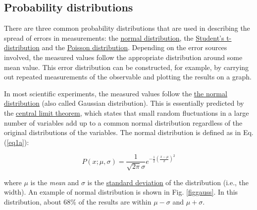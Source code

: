 \documentclass[byrevtex,amssymb,aps,pra,floatfix,letterpaper]{revtex4}
\begin{document}
\subsection{Probability distributions}

There are three common probability distributions that are used in describing the spread of errors in measurements: the \href{http://en.wikipedia.org/wiki/Normal_distribution}{\underline{normal distribution}}, the \href{http://en.wikipedia.org/wiki/Student's_t-distribution}{\underline{Student's t-distribution}} and the \href{http://en.wikipedia.org/wiki/Poisson_distribution}{\underline{Poisson distribution}}. Depending on the error sources involved, the measured values follow the appropriate distribution around some mean value. This error distribution can be constructed, for example, by carrying out repeated measurements of the observable and plotting the results on a graph.

In most scientific experiments, the measured values follow the \href{http://en.wikipedia.org/wiki/Normal_distribution}{\underline{the normal distribution}} (also called Gaussian distribution). This is essentially predicted by the \href{http://en.wikipedia.org/wiki/Central_limit_theorem}{\underline{central limit theorem}}, which states that small random fluctuations in a large number of variables add up to a common normal distribution regardless of the original distributions of the variables. The normal distribution is defined as in Eq. (\ref{eq1a}):

\begin{equation}
\label{eq1a}
P(x; \mu, \sigma) = \frac{1}{\sqrt{2\pi}\sigma}e^{-\frac{1}{2}\left(\frac{x-\mu}{\sigma}\right)^2}
\end{equation}

\noindent
where $\mu$ is the \textit{mean} and $\sigma$ is the \href{http://en.wikipedia.org/wiki/Standard_deviation}{\underline{standard deviation}} of the distribution (i.e., the width). An example of normal distribution is shown in Fig. \ref{figgauss}. In this distribution, about 68\% of the results are within $\mu - \sigma$ and $\mu + \sigma$.
\end{document}
